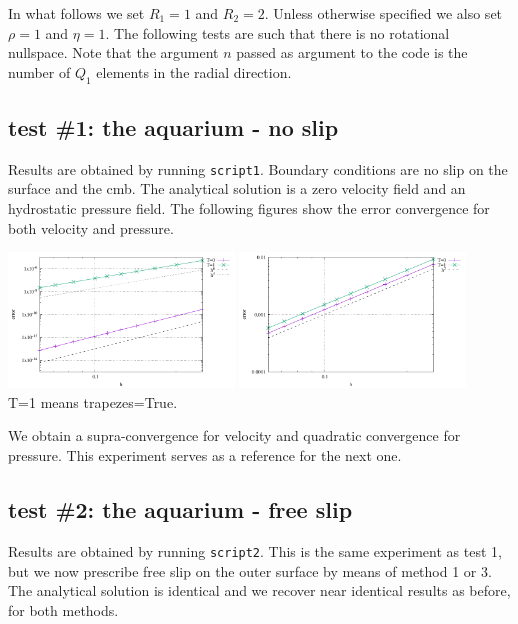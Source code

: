 In what follows we set $R_1=1$ and $R_2=2$. Unless otherwise specified we also set $\rho=1$
and $\eta=1$. The following tests are such that there is no rotational nullspace.
Note that the argument $n$ passed as argument to the code is the number of $Q_1$ 
elements in the radial direction.

\subsection*{test \#1: the aquarium - no slip}

Results are obtained by running {\tt script1}. Boundary conditions are 
no slip on the surface and the cmb. 
The analytical solution is a zero velocity field and an hydrostatic pressure field.
The following figures show the error convergence for both velocity and pressure.

\begin{center}
\includegraphics[width=6cm]{python_codes/fieldstone_151/results/test1/errv}
\includegraphics[width=6cm]{python_codes/fieldstone_151/results/test1/errp}\\
{\captionfont T=1 means {\python trapezes=True}.}
\end{center}

We obtain a supra-convergence for velocity and quadratic convergence for pressure.
This experiment serves as a reference for the next one.

\subsection*{test \#2: the aquarium - free slip}

Results are obtained by running {\tt script2}. 
This is the same experiment as test 1, but we now prescribe free slip on the 
outer surface by means of method 1 or 3. The analytical solution is identical 
and we recover near identical results as before, for both methods.

